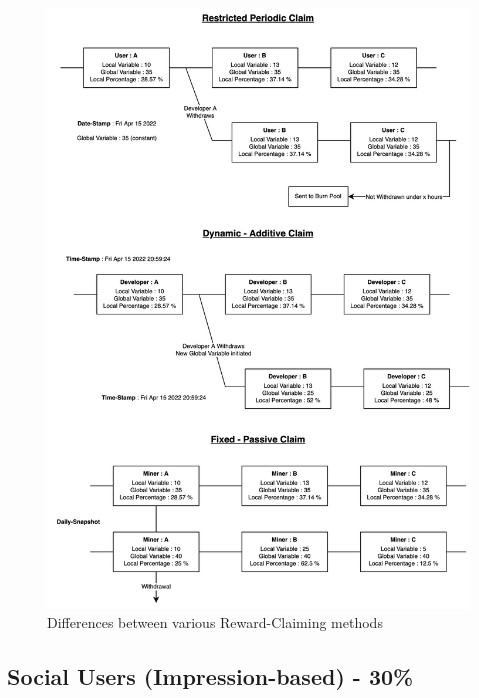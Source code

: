\documentclass[conference]{IEEEtran}
\begin{document}
\begin{figure}
\begin{center}
\includegraphics[width=15cm]{claim-rewards}
\caption{Differences between various Reward-Claiming methods}
\end{center}
\end{figure}





\subsection{\textbf{Social Users (Impression-based) - 30\%}}
\end{document}
